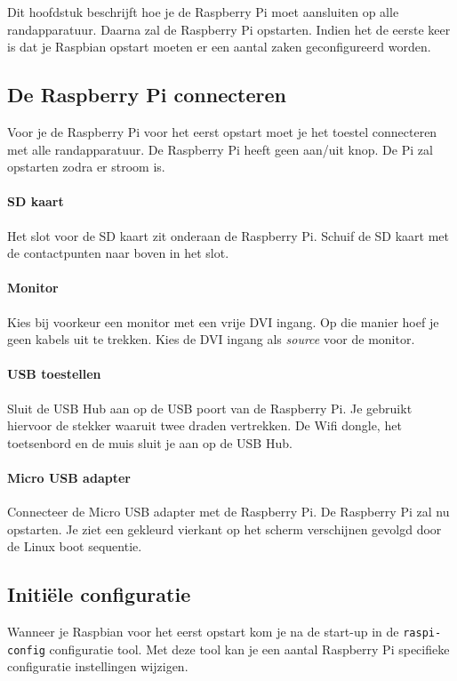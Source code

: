 \documentclass[a4paper]{article}
\begin{document}
    Dit hoofdstuk beschrijft hoe je de Raspberry Pi moet aansluiten op
alle randapparatuur.  Daarna zal de Raspberry Pi opstarten.  Indien
het de eerste keer is dat je Raspbian opstart moeten er een aantal
zaken geconfigureerd worden.

    \subsection{De Raspberry Pi connecteren}

      Voor je de Raspberry Pi voor het eerst opstart moet je het
toestel connecteren met alle randapparatuur.  De Raspberry Pi heeft
geen aan/uit knop.  De Pi zal opstarten zodra er stroom is.

      \paragraph{SD kaart} Het slot voor de SD kaart zit onderaan de
Raspberry Pi.  Schuif de SD kaart met de contactpunten naar boven in
het slot.

      \paragraph{Monitor} Kies bij voorkeur een monitor met een vrije
DVI ingang.  Op die manier hoef je geen kabels uit te trekken.  Kies
de DVI ingang als \emph{source} voor de monitor.

      \paragraph{USB toestellen} Sluit de USB Hub aan op de USB poort
van de Raspberry Pi.  Je gebruikt hiervoor de stekker waaruit twee
draden vertrekken.  De Wifi dongle, het toetsenbord en de muis sluit
je aan op de USB Hub.

      \paragraph{Micro USB adapter} Connecteer de Micro USB adapter
met de Raspberry Pi.  De Raspberry Pi zal nu opstarten.  Je ziet een
gekleurd vierkant op het scherm verschijnen gevolgd door de Linux boot
sequentie.

    \subsection{Initi\"ele configuratie}

      Wanneer je Raspbian voor het eerst opstart kom je na de start-up
in de \texttt{raspi-config} configuratie tool.  Met deze tool kan je
een aantal Raspberry Pi specifieke configuratie instellingen wijzigen.
\end{document}

